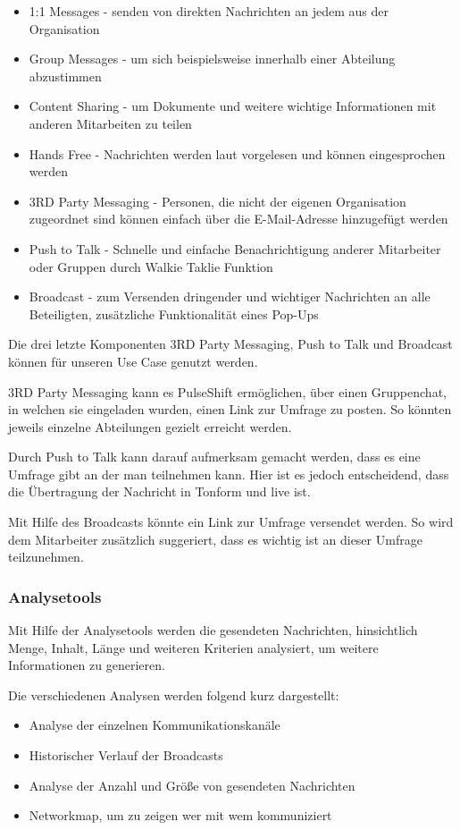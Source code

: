 \begin{itemize}
\item 1:1 Messages - senden von direkten Nachrichten an jedem aus der Organisation
\item Group Messages - um sich beispielsweise innerhalb einer Abteilung abzustimmen
\item Content Sharing - um Dokumente und weitere wichtige Informationen mit anderen Mitarbeiten zu teilen
\item Hands Free - Nachrichten werden laut vorgelesen und können eingesprochen werden
\item 3RD Party Messaging - Personen, die nicht der eigenen Organisation zugeordnet sind können einfach über die E-Mail-Adresse hinzugefügt werden
\item Push to Talk - Schnelle und einfache Benachrichtigung anderer Mitarbeiter oder Gruppen durch Walkie Taklie Funktion
\item Broadcast - zum Versenden dringender und wichtiger Nachrichten an alle Beteiligten, zusätzliche Funktionalität eines Pop-Ups
\end{itemize}

Die drei letzte Komponenten 3RD Party Messaging, Push to Talk und Broadcast können für unseren Use Case genutzt werden.

3RD Party Messaging kann es PulseShift ermöglichen, über einen Gruppenchat, in welchen sie eingeladen wurden, einen Link zur Umfrage zu posten. So könnten jeweils einzelne Abteilungen gezielt erreicht werden.

Durch Push to Talk kann darauf aufmerksam gemacht werden, dass es eine Umfrage gibt an der man teilnehmen kann. Hier ist es jedoch entscheidend, dass die Übertragung der Nachricht in Tonform und live ist. 

Mit Hilfe des Broadcasts könnte ein Link zur Umfrage versendet werden. So wird dem Mitarbeiter zusätzlich suggeriert, dass es wichtig ist an dieser Umfrage teilzunehmen. 

\subsubsection{Analysetools}
Mit Hilfe der Analysetools werden die gesendeten Nachrichten, hinsichtlich Menge, Inhalt, Länge und weiteren Kriterien analysiert, um weitere Informationen zu generieren. 

Die verschiedenen Analysen werden folgend kurz dargestellt: 

\begin{itemize}
\item Analyse der einzelnen Kommunikationskanäle
\item Historischer Verlauf der Broadcasts
\item Analyse der Anzahl und Größe von gesendeten Nachrichten
\item Networkmap, um zu zeigen wer mit wem kommuniziert
\end{itemize}


